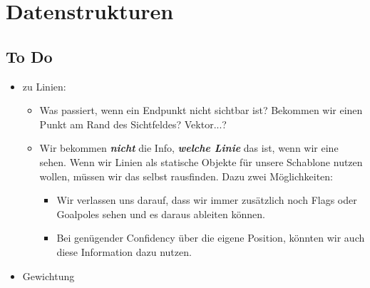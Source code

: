 \section{Datenstrukturen}
\subsection{To Do}
\begin{itemize}
\item  zu Linien:
\begin{itemize}
	\item  Was passiert, wenn ein Endpunkt nicht sichtbar ist? Bekommen wir einen Punkt am Rand des Sichtfeldes? Vektor...?
	\item  Wir bekommen \textit{\textbf{nicht}} die Info, \textit{\textbf{welche Linie}}
 das ist, wenn wir eine sehen. Wenn wir Linien als statische Objekte für
 unsere Schablone nutzen wollen, müssen wir das selbst rausfinden. Dazu 
zwei Möglichkeiten:
	\begin{itemize}
		\item  Wir verlassen uns darauf, dass wir immer zusätzlich noch Flags oder Goalpoles sehen und es daraus ableiten können.
		\item  Bei genügender Confidency über die eigene Position, könnten wir auch diese Information dazu nutzen.
	\end{itemize}
\end{itemize}
\item Gewichtung
\end{itemize}

